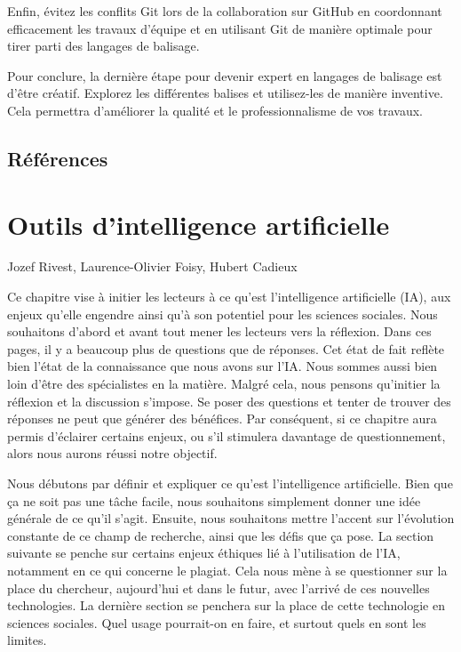 \documentclass[
  letterpaper,
]{scrbook}
\begin{document}
Enfin, évitez les conflits Git lors de la collaboration sur GitHub en
coordonnant efficacement les travaux d'équipe et en utilisant Git de
manière optimale pour tirer parti des langages de balisage.

Pour conclure, la dernière étape pour devenir expert en langages de
balisage est d'être créatif. Explorez les différentes balises et
utilisez-les de manière inventive. Cela permettra d'améliorer la qualité
et le professionnalisme de vos travaux.

\hypertarget{ruxe9fuxe9rences-1}{%
\section{Références}\label{ruxe9fuxe9rences-1}}


\hypertarget{outils-dintelligence-artificielle}{%
\chapter{Outils d'intelligence
artificielle}\label{outils-dintelligence-artificielle}}

\begin{center}

Jozef Rivest, Laurence-Olivier Foisy, Hubert Cadieux

\end{center}

Ce chapitre vise à initier les lecteurs à ce qu'est l'intelligence
artificielle (IA), aux enjeux qu'elle engendre ainsi qu'à son potentiel
pour les sciences sociales. Nous souhaitons d'abord et avant tout mener
les lecteurs vers la réflexion. Dans ces pages, il y a beaucoup plus de
questions que de réponses. Cet état de fait reflète bien l'état de la
connaissance que nous avons sur l'IA. Nous sommes aussi bien loin d'être
des spécialistes en la matière. Malgré cela, nous pensons qu'initier la
réflexion et la discussion s'impose. Se poser des questions et tenter de
trouver des réponses ne peut que générer des bénéfices. Par conséquent,
si ce chapitre aura permis d'éclairer certains enjeux, ou s'il stimulera
davantage de questionnement, alors nous aurons réussi notre objectif.

Nous débutons par définir et expliquer ce qu'est l'intelligence
artificielle. Bien que ça ne soit pas une tâche facile, nous souhaitons
simplement donner une idée générale de ce qu'il s'agit. Ensuite, nous
souhaitons mettre l'accent sur l'évolution constante de ce champ de
recherche, ainsi que les défis que ça pose. La section suivante se
penche sur certains enjeux éthiques lié à l'utilisation de l'IA,
notamment en ce qui concerne le plagiat. Cela nous mène à se questionner
sur la place du chercheur, aujourd'hui et dans le futur, avec l'arrivé
de ces nouvelles technologies. La dernière section se penchera sur la
place de cette technologie en sciences sociales. Quel usage pourrait-on
en faire, et surtout quels en sont les limites.
\end{document}

